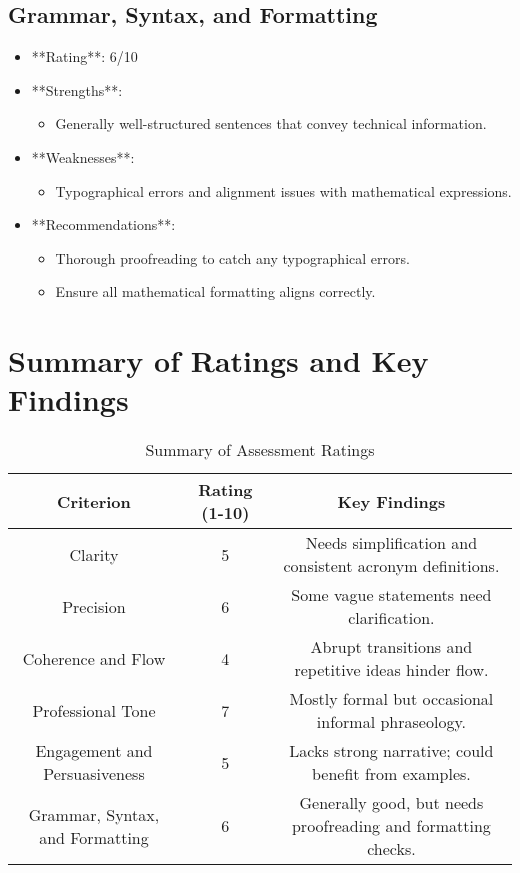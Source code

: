 \documentclass[11pt]{article}
\begin{document}
\subsection{Grammar, Syntax, and Formatting}
\begin{itemize}
    \item **Rating**: 6/10
    \item **Strengths**:
        \begin{itemize}
            \item Generally well-structured sentences that convey technical information.
        \end{itemize}
    \item **Weaknesses**:
        \begin{itemize}
            \item Typographical errors and alignment issues with mathematical expressions.
        \end{itemize}
    \item **Recommendations**:
        \begin{itemize}
            \item Thorough proofreading to catch any typographical errors.
            \item Ensure all mathematical formatting aligns correctly.
        \end{itemize}
\end{itemize}

\section{Summary of Ratings and Key Findings}
\begin{table}[h]
    \centering
    \begin{tabular}{|c|c|c|}
        \hline
        \textbf{Criterion} & \textbf{Rating (1-10)} & \textbf{Key Findings} \\ \hline
        Clarity & 5 & Needs simplification and consistent acronym definitions. \\ \hline
        Precision & 6 & Some vague statements need clarification. \\ \hline
        Coherence and Flow & 4 & Abrupt transitions and repetitive ideas hinder flow. \\ \hline
        Professional Tone & 7 & Mostly formal but occasional informal phraseology. \\ \hline
        Engagement and Persuasiveness & 5 & Lacks strong narrative; could benefit from examples. \\ \hline
        Grammar, Syntax, and Formatting & 6 & Generally good, but needs proofreading and formatting checks. \\ \hline
    \end{tabular}
    \caption{Summary of Assessment Ratings}
    \label{tab:summary}
\end{table}
\end{document}
